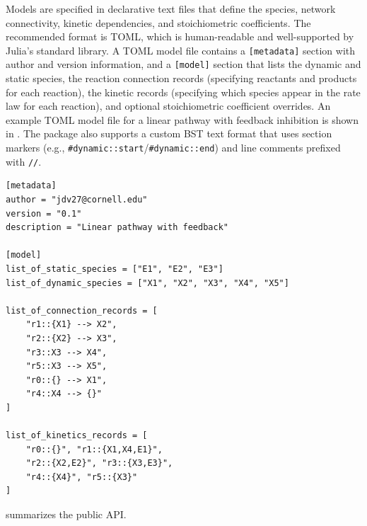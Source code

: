 \documentclass[11pt]{article}
\begin{document}
Models are specified in declarative text files that define the species, network connectivity, kinetic dependencies, and stoichiometric coefficients. The recommended format is TOML, which is human-readable and well-supported by Julia's standard library. A TOML model file contains a \texttt{[metadata]} section with author and version information, and a \texttt{[model]} section that lists the dynamic and static species, the reaction connection records (specifying reactants and products for each reaction), the kinetic records (specifying which species appear in the rate law for each reaction), and optional stoichiometric coefficient overrides. An example TOML model file for a linear pathway with feedback inhibition is shown in . The package also supports a custom BST text format that uses section markers (e.g., \texttt{\#dynamic::start}/\texttt{\#dynamic::end}) and line comments prefixed with \texttt{//}.

\begin{lstlisting}[caption={TOML model file for a linear pathway with feedback inhibition.},label={lst:toml},language={}]
[metadata]
author = "jdv27@cornell.edu"
version = "0.1"
description = "Linear pathway with feedback"

[model]
list_of_static_species = ["E1", "E2", "E3"]
list_of_dynamic_species = ["X1", "X2", "X3", "X4", "X5"]

list_of_connection_records = [
    "r1::{X1} --> X2",
    "r2::{X2} --> X3",
    "r3::X3 --> X4",
    "r5::X3 --> X5",
    "r0::{} --> X1",
    "r4::X4 --> {}"
]

list_of_kinetics_records = [
    "r0::{}", "r1::{X1,X4,E1}",
    "r2::{X2,E2}", "r3::{X3,E3}",
    "r4::{X4}", "r5::{X3}"
]
\end{lstlisting}

 summarizes the public API.
\end{document}
